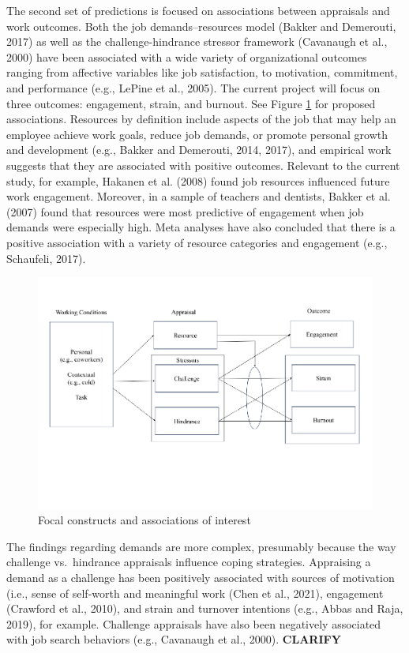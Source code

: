 \documentclass[
  man]{apa7}
\begin{document}
The second set of predictions is focused on associations between appraisals and work outcomes. Both the job demands--resources model (Bakker and Demerouti, 2017) as well as the challenge-hindrance stressor framework (Cavanaugh et al., 2000) have been associated with a wide variety of organizational outcomes ranging from affective variables like job satisfaction, to motivation, commitment, and performance (e.g., LePine et al., 2005). The current project will focus on three outcomes: engagement, strain, and burnout. See Figure \ref{fig:ourmodel} for proposed associations. Resources by definition include aspects of the job that may help an employee achieve work goals, reduce job demands, or promote personal growth and development (e.g., Bakker and Demerouti, 2014, 2017), and empirical work suggests that they are associated with positive outcomes. Relevant to the current study, for example, Hakanen et al. (2008) found job resources influenced future work engagement. Moreover, in a sample of teachers and dentists, Bakker et al. (2007) found that resources were most predictive of engagement when job demands were especially high. Meta analyses have also concluded that there is a positive association with a variety of resource categories and engagement (e.g., Schaufeli, 2017).

\begin{figure}
\centering
\includegraphics{Submission_files/figure-latex/ourmodel-1.pdf}
\caption{\label{fig:ourmodel}Focal constructs and associations of interest}
\end{figure}

The findings regarding demands are more complex, presumably because the way challenge vs.~hindrance appraisals influence coping strategies. Appraising a demand as a challenge has been positively associated with sources of motivation (i.e., sense of self-worth and meaningful work (Chen et al., 2021), engagement (Crawford et al., 2010), and strain and turnover intentions (e.g., Abbas and Raja, 2019), for example. Challenge appraisals have also been negatively associated with job search behaviors (e.g., Cavanaugh et al., 2000). \textbf{CLARIFY}
\end{document}
